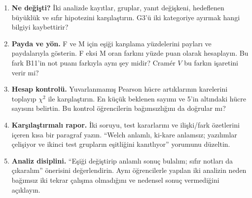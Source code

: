 \begin{enumerate}
  \item \textbf{Ne değişti?} İki analizde kayıtlar, gruplar, yanıt
  değişkeni, hedeflenen büyüklük ve sıfır hipotezini karşılaştırın.
  G3'ü iki kategoriye ayırmak hangi bilgiyi kaybettirir?
  \item \textbf{Payda ve yön.} F ve M için eşiği karşılama yüzdelerini
  payları ve paydalarıyla gösterin. F eksi M oran farkını yüzde puan
  olarak hesaplayın. Bu fark B11'in not puanı farkıyla aynı şey midir?
  Cramér $V$ bu farkın işaretini verir mi?
  \item \textbf{Hesap kontrolü.} Yuvarlanmamış Pearson hücre
  artıklarının karelerini toplayıp $\chi^2$ ile karşılaştırın.
  En küçük beklenen sayımı ve 5'in altındaki hücre sayısını belirtin.
  Bu kontrol öğrencilerin bağımsızlığını da doğrular mı?
  \item \textbf{Karşılaştırmalı rapor.} İki soruyu, test kararlarını
  ve ilişki/fark özetlerini içeren kısa bir paragraf yazın.
  ``Welch anlamlı, ki-kare anlamsız; yazılımlar çelişiyor ve ikinci
  test grupların eşitliğini kanıtlıyor'' yorumunu düzeltin.
  \item \textbf{Analiz disiplini.} ``Eşiği değiştirip anlamlı sonuç
  bulalım; sıfır notları da çıkaralım'' önerisini değerlendirin.
  Aynı öğrencilerle yapılan iki analizin neden bağımsız iki tekrar
  çalışma olmadığını ve nedensel sonuç vermediğini açıklayın.
\end{enumerate}

